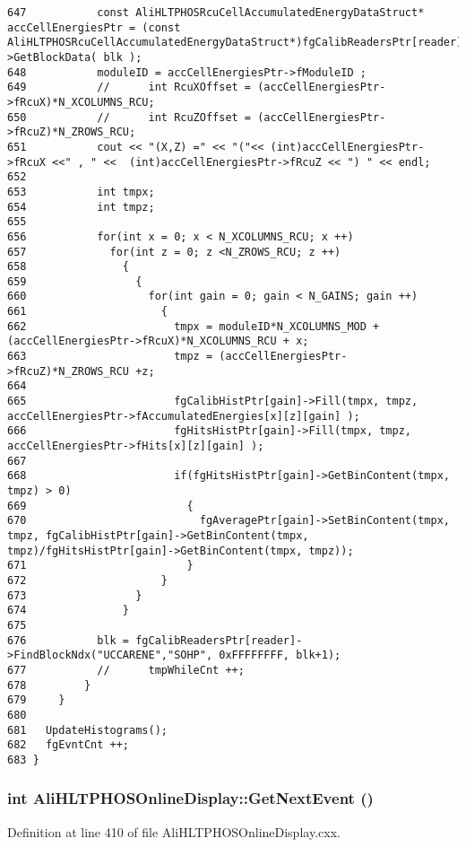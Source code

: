 \begin{verbatim}
647           const AliHLTPHOSRcuCellAccumulatedEnergyDataStruct* accCellEnergiesPtr = (const AliHLTPHOSRcuCellAccumulatedEnergyDataStruct*)fgCalibReadersPtr[reader]->GetBlockData( blk ); 
648           moduleID = accCellEnergiesPtr->fModuleID ;
649           //      int RcuXOffset = (accCellEnergiesPtr->fRcuX)*N_XCOLUMNS_RCU;
650           //      int RcuZOffset = (accCellEnergiesPtr->fRcuZ)*N_ZROWS_RCU;
651           cout << "(X,Z) =" << "("<< (int)accCellEnergiesPtr->fRcuX <<" , " <<  (int)accCellEnergiesPtr->fRcuZ << ") " << endl;
652           
653           int tmpx;
654           int tmpz;
655 
656           for(int x = 0; x < N_XCOLUMNS_RCU; x ++)
657             for(int z = 0; z <N_ZROWS_RCU; z ++)
658               {
659                 {
660                   for(int gain = 0; gain < N_GAINS; gain ++)
661                     {
662                       tmpx = moduleID*N_XCOLUMNS_MOD + (accCellEnergiesPtr->fRcuX)*N_XCOLUMNS_RCU + x;
663                       tmpz = (accCellEnergiesPtr->fRcuZ)*N_ZROWS_RCU +z;
664 
665                       fgCalibHistPtr[gain]->Fill(tmpx, tmpz, accCellEnergiesPtr->fAccumulatedEnergies[x][z][gain] );
666                       fgHitsHistPtr[gain]->Fill(tmpx, tmpz, accCellEnergiesPtr->fHits[x][z][gain] );
667                       
668                       if(fgHitsHistPtr[gain]->GetBinContent(tmpx, tmpz) > 0)
669                         {
670                           fgAveragePtr[gain]->SetBinContent(tmpx, tmpz, fgCalibHistPtr[gain]->GetBinContent(tmpx, tmpz)/fgHitsHistPtr[gain]->GetBinContent(tmpx, tmpz));
671                         }
672                     }
673                 }
674               }
675 
676           blk = fgCalibReadersPtr[reader]->FindBlockNdx("UCCARENE","SOHP", 0xFFFFFFFF, blk+1);
677           //      tmpWhileCnt ++;
678         } 
679     }
680   
681   UpdateHistograms();
682   fgEvntCnt ++;
683 }
\end{verbatim}\normalsize 


\subsubsection{\setlength{\rightskip}{0pt plus 5cm}int Ali\-HLTPHOSOnline\-Display::Get\-Next\-Event ()}\label{classAliHLTPHOSOnlineDisplay_a1}




Definition at line 410 of file Ali\-HLTPHOSOnline\-Display.cxx.

